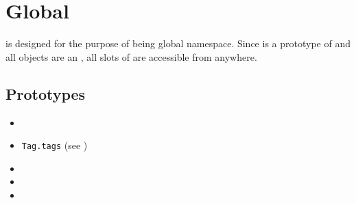 \section{Global}

 is designed for the purpose of being global
namespace. Since  is a prototype of  and all
objects are an , all slots of  are accessible from
anywhere.

\subsection{Prototypes}
\begin{itemize}
\item {}
\item \lstinline|Tag.tags| (see )
\item {}
\item {}
\item {}
\end{itemize}

